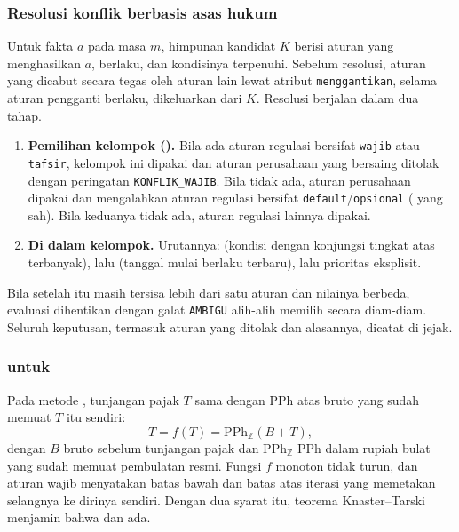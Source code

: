 \subsubsection{Resolusi konflik berbasis asas hukum}
\label{subsec:konflik}
Untuk fakta $a$ pada masa $m$, himpunan kandidat $K$ berisi aturan yang menghasilkan $a$, berlaku, dan kondisinya terpenuhi. Sebelum resolusi, aturan yang dicabut secara tegas oleh aturan lain lewat atribut \texttt{menggantikan}, selama aturan pengganti berlaku, dikeluarkan dari $K$. Resolusi berjalan dalam dua tahap.
\begin{enumerate}[leftmargin=*,nosep]
  \item \textbf{Pemilihan kelompok ().} Bila ada aturan regulasi bersifat \texttt{wajib} atau \texttt{tafsir}, kelompok ini dipakai dan aturan perusahaan yang bersaing ditolak dengan peringatan \texttt{KONFLIK\_WAJIB}. Bila tidak ada, aturan perusahaan dipakai dan mengalahkan aturan regulasi bersifat \texttt{default}/\texttt{opsional} ( yang sah). Bila keduanya tidak ada, aturan regulasi lainnya dipakai.
  \item \textbf{Di dalam kelompok.} Urutannya:  (kondisi dengan konjungsi tingkat atas terbanyak), lalu  (tanggal mulai berlaku terbaru), lalu prioritas eksplisit.
\end{enumerate}
Bila setelah itu masih tersisa lebih dari satu aturan dan nilainya berbeda, evaluasi dihentikan dengan galat \texttt{AMBIGU} alih-alih memilih secara diam-diam. Seluruh keputusan, termasuk aturan yang ditolak dan alasannya, dicatat di jejak.

\subsubsection{ untuk }
\label{subsec:fixedpoint}
Pada metode , tunjangan pajak $T$ sama dengan PPh atas bruto yang sudah memuat $T$ itu sendiri:
\begin{equation}
T = f(T) = \mathrm{PPh}_{\mathbb{Z}}(B + T),
\label{eq:grossup}
\end{equation}
dengan $B$ bruto sebelum tunjangan pajak dan $\mathrm{PPh}_{\mathbb{Z}}$ PPh dalam rupiah bulat yang sudah memuat pembulatan resmi. Fungsi $f$ monoton tidak turun, dan aturan  wajib menyatakan batas bawah dan batas atas iterasi yang memetakan selangnya ke dirinya sendiri. Dengan dua syarat itu, teorema  Knaster--Tarski menjamin bahwa  dan  ada.


